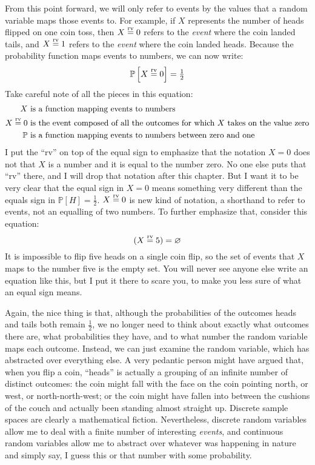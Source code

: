 From this point forward, we will only refer to events by the values that a random
variable maps those events to. For example, if $X$ represents the number of heads
flipped on one coin toss, then $X \stackrel{\text{rv}}{=} 0$ refers to the \emph{event} where the coin landed tails, and $X \stackrel{\text{rv}}{=} 1$ refers to the \emph{event} where the coin landed heads.
Because the probability function maps events to numbers, we can now write:
\begin{equation*}
  \mathbb{P}\left[{X \stackrel{\text{rv}}{=} 0}\right] = \tfrac{1}{2}
\end{equation*}
Take careful note of all the pieces in this equation:
\begin{align*}
  X &\text{ is a function mapping events to numbers} \\
  X \stackrel{\text{rv}}{=} 0 &\text{ is the event composed of all the outcomes for which $X$ takes on the value zero} \\
  \mathbb{P} &\text{ is a function mapping events to numbers between zero and one}
\end{align*}
I put the ``rv'' on top of the equal sign to emphasize that the notation $X=0$ does
not that $X$ is a number and it is equal to the number zero. No one else puts that
``rv'' there, and I will drop that notation after this chapter. But I want it to be
very clear that the equal sign in $X=0$ means something very different than the
equals sign in $\mathbb{P}[H] = \tfrac{1}{2}$. $X \stackrel{\text{rv}}{=} 0$ is new kind of notation,
a shorthand to refer to events, not an equalling of two numbers. To further emphasize
that, consider this equation:
\begin{equation*}
    (X \stackrel{\text{rv}}{=} 5) = \varnothing
\end{equation*}
It is impossible to flip five heads on a single coin flip, so the set of events that
$X$ maps to the number five is the empty set. You will never see anyone else write an
equation like this, but I put it there to scare you, to make you less sure of what
an equal sign means.

Again, the nice thing is that, although the probabilities of the outcomes heads and
tails both remain $\tfrac{1}{2}$, we no longer need to think about exactly what
outcomes there are, what probabilities they have, and to what number the random
variable maps each outcome. Instead, we can just examine the random variable,
which has abstracted over everything else. A very pedantic person might have argued
that, when you flip a coin, ``heads'' is actually a grouping of an infinite number
of distinct outcomes: the coin might fall with the face on the coin pointing north,
or west, or north-north-west; or the coin might have fallen into between the cushions
of the couch and actually been standing almost straight up. Discrete sample spaces
are clearly a mathematical fiction. Nevertheless, discrete random variables allow me
to deal with a finite number of interesting \emph{events}, and continuous random
variables allow me to abstract over whatever was happening in nature and simply say,
I guess this or that number with some probability.

